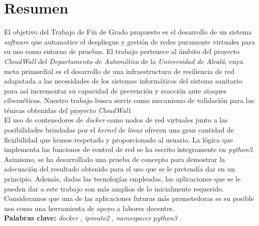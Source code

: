 \chapter{Resumen}
    \thispagestyle{empty}

    El objetivo del Trabajo de Fin de Grado propuesto es el desarrollo de un sistema \textit{software} que automatice el despliegue y gestión de redes puramente virtuales para su uso como entorno de pruebas. El trabajo pertenece al ámbito del proyecto \textit{CloudWall} \cite{bib:react} del \textit{Departamento de Automática} de la \textit{Universidad de Alcalá}, cuya meta primordial es el desarrollo de una infraestructura de resiliencia de red adapatada a las necesidades de los sistemas informáticos del sistema sanitario para así incrementar su capacidad de prevención y reacción ante ataques cibernéticos. Nuestro trabajo busca servir como mecanismo de validación para las ténicas obtenidas del proyecto \textit{CloudWall}.\\

    El uso de contenedores de \textit{docker} como nodos de red virtuales junto a las posibilidades brindadas por el \textit{kernel} de \textit{linux} ofrecen una gran cantidad de flexibilidad que hemos respetado y proporcionado al usuario. La lógica que implementa las funciones de control de red se ha escrito íntegramente en \textit{python3}. Asimismo, se ha desarrollado una prueba de concepto para demostrar la adecuación del resultado obtenido para el uso que se le pretendía dar en un principio. Además, dadas las tecnologías empleadas, las aplicaciones que se le pueden dar a este trabajo son más amplios de lo inicialmente requerido. Consideramos que una de las aplicaciones futuras más prometedoras es su posible uso como una herramienta de apoyo a labores docentes.\\

    \textbf{Palabras clave:} \textit{docker} \cite{bib:docker}, \textit{iproute2} \cite{bib:man-ip}, \textit{namespaces} \cite{bib:man-namespaces} \textit{python3} \cite{bib:python}.

